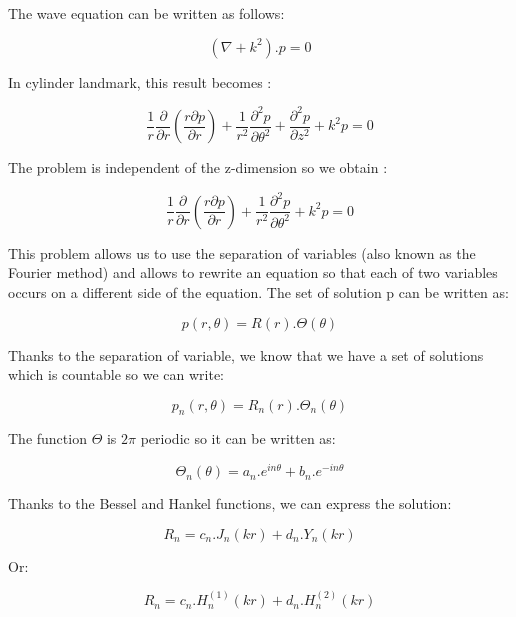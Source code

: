The wave equation can be written as follows:

\begin{equation}
 (\nabla + k^2).p = 0 
\end{equation}

In cylinder landmark, this result becomes :

\begin{equation}
 \frac{1}{r}\frac{\partial}{\partial r}(
 \frac{ r \partial p}{\partial r}) + \frac{1}{r^2}\frac{\partial^2 p}{\partial \theta^2} + \frac{\partial^2 p}{\partial z^2} + k^2 p = 0 
\end{equation}

The problem is independent of the z-dimension so we obtain :

\begin{equation}
 \frac{1}{r}\frac{\partial}{\partial r}(
 \frac{ r \partial p}{\partial r}) + \frac{1}{r^2}\frac{\partial^2 p}{\partial \theta^2} + k^2 p = 0 
\end{equation}

This problem allows us to use the separation of variables (also known as the Fourier method) and allows to rewrite an equation so that each of two variables occurs on a different side of the equation. The set of solution p can be written as:

\begin{equation}
 p(r,\theta) = R(r).\Theta(\theta)
\end{equation}

Thanks to the separation of variable, we know that we have a set of solutions which is countable so we can write:

\begin{equation}
p_{n}(r,\theta) = R_{n}(r).\Theta_{n}(\theta)
\end{equation}

The function $\Theta$ is $2\pi$ periodic so it can be written as:

\begin{equation}
\Theta_{n}(\theta) = a_{n}.e^{in\theta} + b_{n}.e^{-in\theta}
\end{equation}

Thanks to the Bessel and Hankel functions, we can express the solution:

\begin{equation}
R_{n} = c_{n}.J_{n}(kr) + d_{n}.Y_{n}(kr)
\end{equation}

Or:

\begin{equation}
R_{n} = c_{n}.H^{(1)}_{n}(kr) + d_{n}.H^{(2)}_{n}(kr)
\end{equation}

